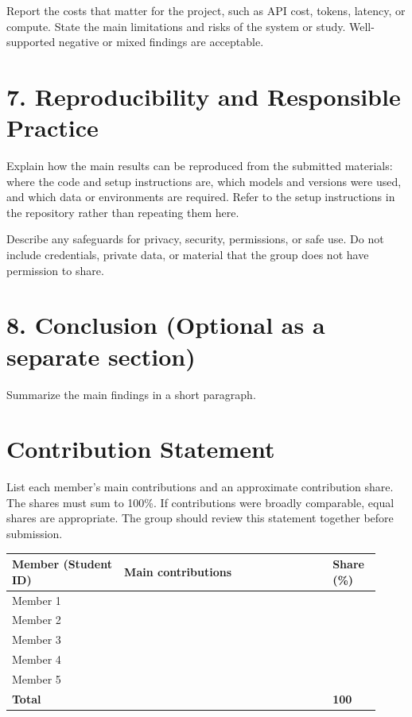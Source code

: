 \documentclass[11pt]{article}
\begin{document}
Report the costs that matter for the project, such as API cost, tokens, latency, or
compute. State the main limitations and risks of the system or study. Well-supported
negative or mixed findings are acceptable.

\section*{7. Reproducibility and Responsible Practice}

Explain how the main results can be reproduced from the submitted materials: where
the code and setup instructions are, which models and versions were used, and which
data or environments are required. Refer to the setup instructions in the repository
rather than repeating them here.

Describe any safeguards for privacy, security, permissions, or safe use. Do not
include credentials, private data, or material that the group does not have
permission to share.

\section*{8. Conclusion (Optional as a separate section)}

Summarize the main findings in a short paragraph.

\clearpage

\section*{Contribution Statement}

List each member's main contributions and an approximate contribution share. The
shares must sum to 100\%. If contributions were broadly comparable, equal shares are
appropriate. The group should review this statement together before submission.

\begin{center}
\begin{tabular}{@{}>{\raggedright\arraybackslash}p{0.28\linewidth}
                >{\raggedright\arraybackslash}p{0.52\linewidth}
                >{\centering\arraybackslash}p{0.12\linewidth}@{}}
\toprule
\textbf{Member (Student ID)} & \textbf{Main contributions} & \textbf{Share (\%)} \\
\midrule
Member 1 & & \\
Member 2 & & \\
Member 3 & & \\
Member 4 & & \\
Member 5 & & \\
\midrule
\textbf{Total} & & \textbf{100} \\
\bottomrule
\end{tabular}
\end{center}
\end{document}
